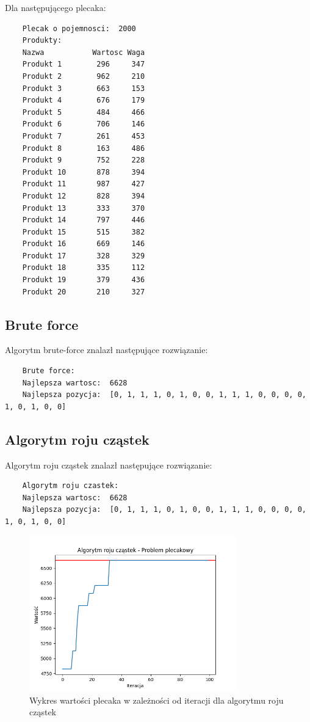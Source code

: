\documentclass{article}
\begin{document}
Dla następującego plecaka:

\begin{lstlisting}
    Plecak o pojemnosci:  2000
    Produkty:
    Nazwa           Wartosc Waga
    Produkt 1        296     347
    Produkt 2        962     210
    Produkt 3        663     153
    Produkt 4        676     179
    Produkt 5        484     466
    Produkt 6        706     146
    Produkt 7        261     453
    Produkt 8        163     486
    Produkt 9        752     228
    Produkt 10       878     394
    Produkt 11       987     427
    Produkt 12       828     394
    Produkt 13       333     370
    Produkt 14       797     446
    Produkt 15       515     382
    Produkt 16       669     146
    Produkt 17       328     329
    Produkt 18       335     112
    Produkt 19       379     436
    Produkt 20       210     327
\end{lstlisting}

\subsection{Brute force}

Algorytm brute-force znalazł następujące rozwiązanie:

\begin{lstlisting}
    Brute force:
    Najlepsza wartosc:  6628
    Najlepsza pozycja:  [0, 1, 1, 1, 0, 1, 0, 0, 1, 1, 1, 0, 0, 0, 0, 1, 0, 1, 0, 0]
\end{lstlisting}

\subsection{Algorytm roju cząstek}
Algorytm roju cząstek znalazł następujące rozwiązanie:

\begin{lstlisting}
    Algorytm roju czastek:
    Najlepsza wartosc:  6628
    Najlepsza pozycja:  [0, 1, 1, 1, 0, 1, 0, 0, 1, 1, 1, 0, 0, 0, 0, 1, 0, 1, 0, 0]
\end{lstlisting}

\begin{figure}[H]
    \centering
    \includegraphics[width=0.8\textwidth]{pso.png}
    \caption{Wykres wartości plecaka w zależności od iteracji dla algorytmu roju cząstek}
\end{figure}
\end{document}
